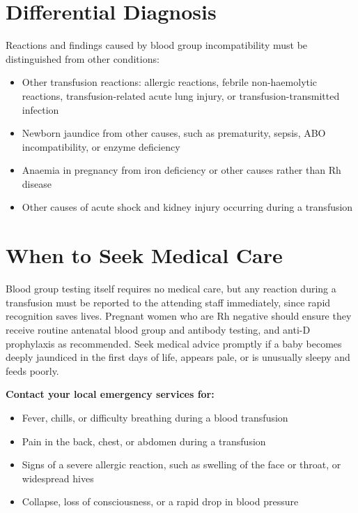 \section*{Differential Diagnosis}
Reactions and findings caused by blood group incompatibility must be distinguished from other conditions:

\begin{itemize}
    \item Other transfusion reactions: allergic reactions, febrile non-haemolytic reactions, transfusion-related acute lung injury, or transfusion-transmitted infection
    \item Newborn jaundice from other causes, such as prematurity, sepsis, ABO incompatibility, or enzyme deficiency
    \item Anaemia in pregnancy from iron deficiency or other causes rather than Rh disease
    \item Other causes of acute shock and kidney injury occurring during a transfusion
\end{itemize}

\section*{When to Seek Medical Care}
Blood group testing itself requires no medical care, but any reaction during a transfusion must be reported to the attending staff immediately, since rapid recognition saves lives. Pregnant women who are Rh negative should ensure they receive routine antenatal blood group and antibody testing, and anti-D prophylaxis as recommended. Seek medical advice promptly if a baby becomes deeply jaundiced in the first days of life, appears pale, or is unusually sleepy and feeds poorly.

\textbf{Contact your local emergency services for:}
\begin{itemize}
    \item Fever, chills, or difficulty breathing during a blood transfusion
    \item Pain in the back, chest, or abdomen during a transfusion
    \item Signs of a severe allergic reaction, such as swelling of the face or throat, or widespread hives
    \item Collapse, loss of consciousness, or a rapid drop in blood pressure
\end{itemize}


